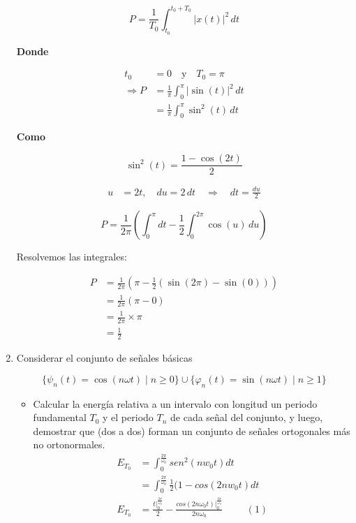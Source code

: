 \documentclass[12pt,a4paper]{report}
\begin{document}
\begin{enumerate}[label=\alph*),left=0pt]
\begin{itemize}[left=0pt]
    \end{itemize}

    $$ P = \frac{1}{T_0} \int_{t_0}^{t_0 + T_0} |x(t)|^2 \, dt $$

    \textbf{Donde}

    $$
    \begin{aligned}
      t_0 &= 0 \quad \text{y} \quad T_0 = \pi \\
      \Longrightarrow P &= \frac{1}{\pi} \int_{0}^{\pi} |\sin(t)|^2 \, dt \\
      &= \frac{1}{\pi} \int_{0}^{\pi} \sin^2(t) \, dt
    \end{aligned}
    $$

    \textbf{Como}

    $$
    \sin^2(t) = \frac{1 - \cos(2t)}{2}
    $$


    $$
    \begin{aligned}
      u &= 2t, \quad du = 2 \, dt \quad \Longrightarrow \quad dt = \frac{du}{2}
    \end{aligned}
    $$

    $$ P = \frac{1}{2\pi} \left( \int_{0}^{\pi} dt - \frac{1}{2} \int_{0}^{2\pi} \cos(u) \, du \right) $$

    Resolvemos las integrales:

    $$
    \begin{aligned}
      P &= \frac{1}{2\pi} \left( \pi - \frac{1}{2} \left( \sin(2\pi) - \sin(0) \right) \right) \\
         &= \frac{1}{2\pi} \left( \pi - 0 \right) \\
         &= \frac{1}{2\pi} \times \pi \\
         &= \frac{1}{2}
    \end{aligned}
    $$

  \item Considerar el conjunto de señales básicas

    $$\{\psi_n(t) = \cos(n\omega t) \mid n \geq 0\} \cup \{\varphi_n(t) = \sin(n\omega t) \mid n \geq 1\}$$

      \begin{itemize}[left=0pt]
      \item Calcular la energía relativa a un intervalo con longitud un periodo fundamental $T_0$ y el periodo $T_n$
        de cada señal del conjunto, y luego, demostrar que (dos a dos) forman un conjunto de señales ortogonales más no
        ortonormales.
    $$
    \begin{aligned}	
    E_{T_0}&=\int^{\frac{2\pi}{\omega_0}}_0 sen^2(nw_0t)dt
    \\
    &=\int^{\frac{2\pi}{\omega_0}}_0\frac{1}{2}(1-cos(2nw_0t)dt\\
    E_{T_0}&=\frac{t|^{\frac{2\pi}{\omega_0}}_0}{2}-\frac{cos(2n\omega_0t)|^{\frac{2\pi}{\omega_0}}_0}{2n\omega_0}\hspace{1cm}(1)
    \end{aligned}
    $$


\end{itemize}
\end{enumerate}
\end{document}
